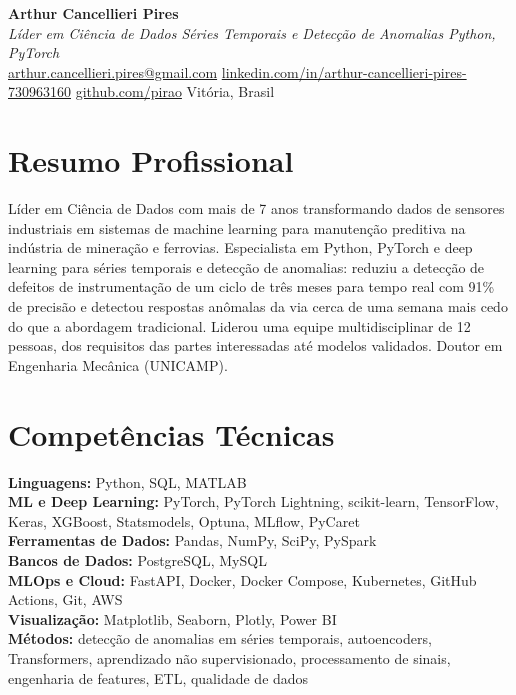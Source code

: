 \documentclass[a4paper,20pt]{article}
\begin{document}
\textbf{{\LARGE Arthur Cancellieri Pires}} \\ \vspace{2pt}
\textit{Líder em Ciência de Dados \textbar{} Séries Temporais e Detecção de Anomalias \textbar{} Python, PyTorch} \\ \vspace{3pt}
{\small \href{mailto:arthur.cancellieri.pires@gmail.com}{arthur.cancellieri.pires@gmail.com}
 \textbar{} \href{https://www.linkedin.com/in/arthur-cancellieri-pires-730963160}{linkedin.com/in/arthur-cancellieri-pires-730963160}
 \textbar{} \href{https://github.com/pirao}{github.com/pirao}
 \textbar{} Vitória, Brasil}

\vspace{-8pt}

\section{Resumo Profissional}
\vspace{1pt}
{\small\justifying Líder em Ciência de Dados com mais de 7 anos transformando dados de sensores industriais em sistemas de machine learning para manutenção preditiva na indústria de mineração e ferrovias. Especialista em Python, PyTorch e deep learning para séries temporais e detecção de anomalias: reduziu a detecção de defeitos de instrumentação de um ciclo de três meses para tempo real com 91\% de precisão e detectou respostas anômalas da via cerca de uma semana mais cedo do que a abordagem tradicional. Liderou uma equipe multidisciplinar de 12 pessoas, dos requisitos das partes interessadas até modelos validados. Doutor em Engenharia Mecânica (UNICAMP).\par}

\vspace{-6pt}

\section{Competências Técnicas}
\vspace{1pt}
{\small
\textbf{Linguagens:} Python, SQL, MATLAB \\
\textbf{ML e Deep Learning:} PyTorch, PyTorch Lightning, scikit-learn, TensorFlow, Keras, XGBoost, Statsmodels, Optuna, MLflow, PyCaret \\
\textbf{Ferramentas de Dados:} Pandas, NumPy, SciPy, PySpark \\
\textbf{Bancos de Dados:} PostgreSQL, MySQL \\
\textbf{MLOps e Cloud:} FastAPI, Docker, Docker Compose, Kubernetes, GitHub Actions, Git, AWS \\
\textbf{Visualização:} Matplotlib, Seaborn, Plotly, Power BI \\
\textbf{Métodos:} detecção de anomalias em séries temporais, autoencoders, Transformers, aprendizado não supervisionado, processamento de sinais, engenharia de features, ETL, qualidade de dados\par}
\end{document}
